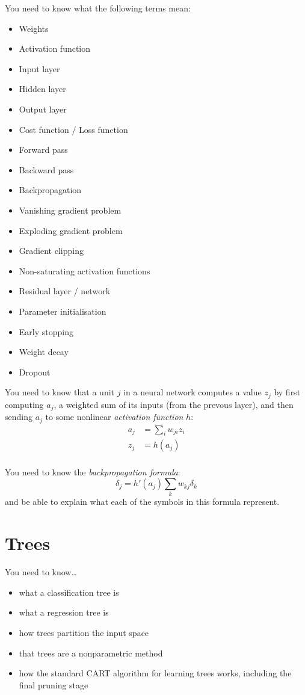 \documentclass{article}
\newcommand{\yntk}{You need to know}
\begin{document}
\yntk{} what the following terms mean:
\begin{itemize}
\item Weights
\item Activation function
\item Input layer
\item Hidden layer
\item Output layer
\item Cost function / Loss function
\item Forward pass
\item Backward pass
\item Backpropagation
\item Vanishing gradient problem
\item Exploding gradient problem
\item Gradient clipping
\item Non-saturating activation functions
\item Residual layer / network
\item Parameter initialisation
\item Early stopping
\item Weight decay
\item Dropout
\end{itemize}

\yntk{} that a unit $j$ in a neural network computes a value $z_j$ by
first computing $a_j$, a weighted sum of its inputs (from the prevous
layer), and then sending $a_j$ to some nonlinear \emph{activation
  function} $h$:
\begin{align}
  \label{eq:preact}
  a_{j} & = \sum_{i}w_{ji}z_{i} \\
  \label{eq:act}
  z_{j} & = h(a_{j}) \\
\end{align}

\yntk{} the \emph{backpropagation formula}:
\begin{equation}
  \label{eq:backprop}
  \delta_{j} = h'(a_{j})\sum_{k}w_{kj}\delta_{k}
\end{equation}
and be able to explain what each of the symbols in this formula represent.

\section{Trees}
\label{sec:trees}

\yntk \dots
\begin{itemize}
\item what a classification tree is
\item what a regression tree is
\item how trees partition the input space
\item that trees are a nonparametric method
\item how the standard CART algorithm for learning trees works,
  including the final pruning stage
\end{itemize}
\end{document}
